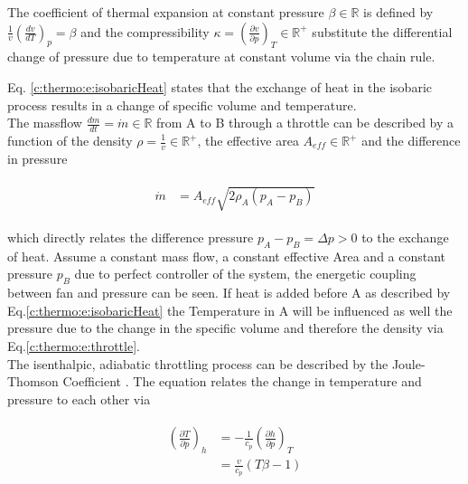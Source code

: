 The coefficient of thermal expansion at constant pressure $\beta \in \mathbb{R}$ is defined by $\frac{1}{v}\left( \frac{dv}{dT} \right)_p = \beta$ and the compressibility $\kappa = \left( \frac{\partial v}{\partial p} \right)_T \in \mathbb{R}^+$ substitute the differential change of pressure due to temperature at constant volume via the chain rule.\newline

Eq. \ref{c:thermo:e:isobaricHeat} states that the exchange of heat in the isobaric process results in a change of specific volume and temperature. \\

The massflow $\frac{dm}{dt} = \dot{m} \in \mathbb{R}$ from A to B through a throttle can be described by a function of the density $\rho = \frac{1}{v} \in \mathbb{R}^+$, the effective area $A_{eff} \in \mathbb{R}^+$ and the difference in pressure 

\begin{align}
\begin{split}
\dot{m} & = A_{eff} \sqrt{2 \rho_A  \left( p_A -p_B \right) }
\end{split}
\label{c:thermo:e:throttle}
\end{align}

which directly relates the difference pressure $p_A - p_B = \Delta p > 0$ to the exchange of heat. Assume a constant mass flow, a constant effective Area and a constant pressure $p_B$ due to perfect controller of the system, the energetic coupling between fan and pressure can be seen. If heat is added before A as described by Eq.\ref{c:thermo:e:isobaricHeat} the Temperature in A will be influenced as well the pressure due to the change in the specific volume and therefore the density via Eq.\ref{c:thermo:e:throttle}.\\

The isenthalpic, adiabatic throttling process can be described by the Joule-Thomson Coefficient \cite[p.387]{Struchtrup2014}. The equation relates the change in temperature and pressure to each other via

\begin{align}
\begin{split}
\left( \frac{\partial T}{\partial p}\right)_h &= -\frac{1}{c_p} \left(\frac{\partial h}{ \partial p} \right)_T \\
&= \frac{v}{c_p}\left( T\beta - 1 \right) 
\end{split}
\label{c:thermo:e:joulethomson}
\end{align}

